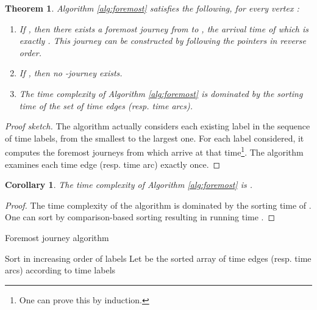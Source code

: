 \documentclass[a4paper,UKenglish]{article}
\newtheorem{theorem}{Theorem}
\newtheorem{corollary}{Corollary}
\begin{document}
\begin{theorem}
Algorithm \ref{alg:foremost} satisfies the following, for every vertex :
\begin{enumerate}[label=(\alph*)]
\item If , then there exists a foremost journey from  to , the arrival time of which is exactly . This journey can be constructed by following the  pointers in reverse order.
\item If , then no -journey exists.
\item The time complexity of Algorithm \ref{alg:foremost} is dominated by the sorting time of the set of time edges (resp. time arcs).
\end{enumerate}
\end{theorem}
\begin{proof}[Proof sketch]
The algorithm actually considers each existing label in the sequence of time labels, from the smallest to the largest one. For each label considered, it computes the foremost journeys from  which arrive at that time\footnote{One can prove this by induction.}. The algorithm examines each time edge (resp. time arc) exactly once.
\end{proof}

\begin{corollary}
The time complexity of Algorithm \ref{alg:foremost} is .
\end{corollary}
\begin{proof}
The time complexity of the algorithm is dominated by the sorting time of . One can sort  by comparison-based sorting resulting in running time .
\end{proof}

\begin{algorithm}[ht]
\caption{Foremost journey algorithm}
\label{alg:foremost}
\SetAlgoLined


Sort  in increasing order of labels 
Let  be the sorted array of time edges (resp. time arcs) according to time labels\;
\;

\end{algorithm}
\end{document}
